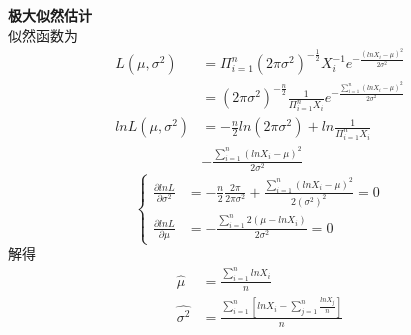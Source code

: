 \documentclass[a4paper,twocolumn]{ctexart}
\begin{document}
\noindent\textbf{极大似然估计}\\
似然函数为
\begin{align*}
L(\mu,\sigma^2)&=\Pi_{i=1}^{n}(2\pi \sigma^2)^{-\frac{1}{2}}X_i^{-1}e^{-\frac{(lnX_i-\mu)^2}{2\sigma^2}}\\
&=(2\pi\sigma^2)^{-\frac{n}{2}}\frac{1}{\Pi_{i=1}^{n}X_i}e^{-\frac{\sum_{i=1}^{n}(lnX_i-\mu)^2}{2\sigma^2}}\\
lnL(\mu,\sigma^2)&=-\frac{n}{2}ln(2\pi\sigma^2)+ln\frac{1}{\Pi_{i=1}^{n}X_i}\\
&-\frac{\sum_{i=1}^{n}(lnX_i-\mu)^2}{2\sigma^2}
\end{align*}
\[
\begin{cases}
\frac{\partial lnL}{\partial \sigma^2}&=-\frac{n}{2}\frac{2\pi}{2\pi\sigma^2}+\frac{\sum_{i=1}^{n}(lnX_i-\mu)^2}{2(\sigma^2)^2}=0\\
\frac{\partial lnL}{\partial \mu}&=-\frac{\sum_{i=1}^{n}2(\mu-lnX_i)}{2\sigma^2}=0
\end{cases}
\]
解得
\begin{align*}
\hat{\mu}&=\frac{\sum_{i=1}^{n}lnX_i}{n}\\
\hat{\sigma^2}&=\frac{\sum_{i=1}^{n}\left[lnX_i-\sum_{j=1}^{n}\frac{lnX_j}{n}\right]}{n}
\end{align*}
\end{document}
